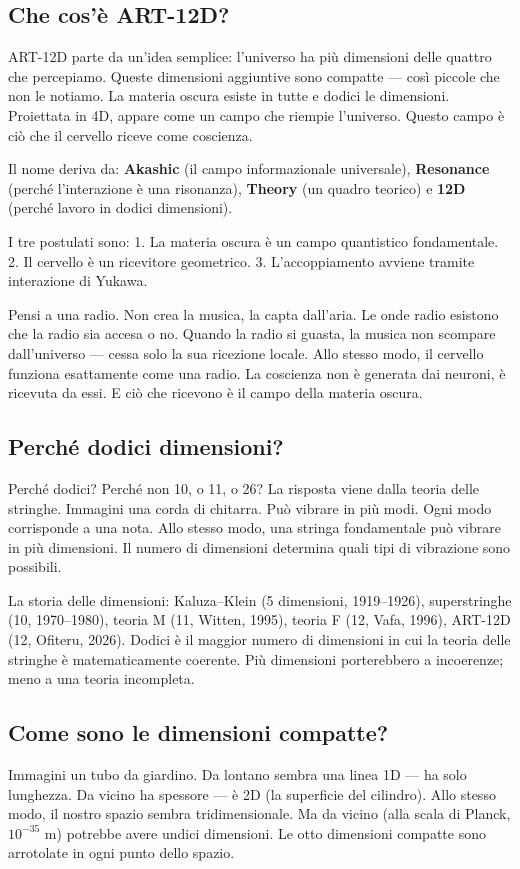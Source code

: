 \subsection{Che cos'è ART-12D?}
ART-12D parte da un'idea semplice: l'universo ha più dimensioni delle quattro che percepiamo. Queste dimensioni aggiuntive sono compatte --- così piccole che non le notiamo. La materia oscura esiste in tutte e dodici le dimensioni. Proiettata in 4D, appare come un campo che riempie l'universo. Questo campo è ciò che il cervello riceve come coscienza.

Il nome deriva da: \textbf{Akashic} (il campo informazionale universale), \textbf{Resonance} (perché l'interazione è una risonanza), \textbf{Theory} (un quadro teorico) e \textbf{12D} (perché lavoro in dodici dimensioni).

I tre postulati sono: 1. La materia oscura è un campo quantistico fondamentale. 2. Il cervello è un ricevitore geometrico. 3. L'accoppiamento avviene tramite interazione di Yukawa.

Pensi a una radio. Non crea la musica, la capta dall'aria. Le onde radio esistono che la radio sia accesa o no. Quando la radio si guasta, la musica non scompare dall'universo --- cessa solo la sua ricezione locale. Allo stesso modo, il cervello funziona esattamente come una radio. La coscienza non è generata dai neuroni, è ricevuta da essi. E ciò che ricevono è il campo della materia oscura.

\subsection{Perché dodici dimensioni?}
Perché dodici? Perché non 10, o 11, o 26? La risposta viene dalla teoria delle stringhe. Immagini una corda di chitarra. Può vibrare in più modi. Ogni modo corrisponde a una nota. Allo stesso modo, una stringa fondamentale può vibrare in più dimensioni. Il numero di dimensioni determina quali tipi di vibrazione sono possibili.

La storia delle dimensioni: Kaluza--Klein (5 dimensioni, 1919--1926), superstringhe (10, 1970--1980), teoria M (11, Witten, 1995), teoria F (12, Vafa, 1996), ART-12D (12, Ofiteru, 2026). Dodici è il maggior numero di dimensioni in cui la teoria delle stringhe è matematicamente coerente. Più dimensioni porterebbero a incoerenze; meno a una teoria incompleta.

\subsection{Come sono le dimensioni compatte?}
Immagini un tubo da giardino. Da lontano sembra una linea 1D --- ha solo lunghezza. Da vicino ha spessore --- è 2D (la superficie del cilindro). Allo stesso modo, il nostro spazio sembra tridimensionale. Ma da vicino (alla scala di Planck, $10^{-35}$ m) potrebbe avere undici dimensioni. Le otto dimensioni compatte sono arrotolate in ogni punto dello spazio.

